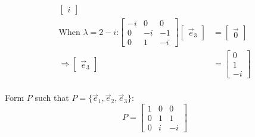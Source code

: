 \documentclass[11pt]{homework}
\begin{document}
\begin{align*}
\begin{bmatrix}
    i
  \end{bmatrix} \\
\text{When $\lambda = 2-i$:}
  \begin{bmatrix}
    -i & 0 & 0 \\
    0 & -i & -1 \\
    0 & 1 & -i
  \end{bmatrix}
  \begin{bmatrix}
    \vec e_3
  \end{bmatrix}
  &=
  \begin{bmatrix}
    \vec 0
  \end{bmatrix} \\
\Rightarrow
  \begin{bmatrix}
    \vec e_3
  \end{bmatrix}
  &=
  \begin{bmatrix}
    0 \\
    1 \\
    -i
  \end{bmatrix} \\
\end{align*}

Form $P$ such that $P = \{\vec e_1, \vec e_2, \vec e_3\}$:
\begin{equation*}
P =
  \begin{bmatrix}
    1 & 0 & 0 \\
    0 & 1 & 1 \\
    0 & i & -i
  \end{bmatrix}
\end{equation*}
\end{document}
